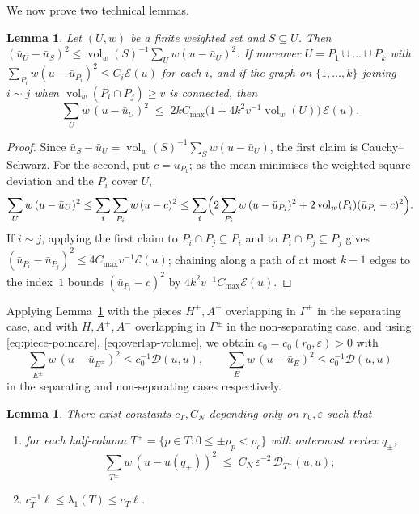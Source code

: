 \documentclass[10pt,reqno]{amsart}
\newtheorem{lemma}[theorem]{Lemma}
\theoremstyle{remark}
\newcommand{\vol}{\operatorname{vol}}
\newcommand{\DD}{\mathcal{D}}
\begin{document}
We now prove two technical lemmas.

\begin{lemma}
\label{lem:glue}
Let $(U,w)$ be a finite weighted set and $S\subseteq U$. Then
$(\bar u_U-\bar u_S)^2\le\vol_w(S)^{-1}\sum_Uw(u-\bar u_U)^2$. If
moreover $U=P_1\cup\dots\cup P_k$ with
$\sum_{P_i}w(u-\bar u_{P_i})^2\le C_i\mathcal E(u)$ for each $i$, and if the
graph on $\{1,\dots,k\}$ joining $i\sim j$ when
$\vol_w(P_i\cap P_j)\ge v$ is connected, then
\[
  \sum_{U}w\,(u-\bar u_U)^2\;\le\;
  2kC_{\max}\bigl(1+4k^2v^{-1}\vol_w(U)\bigr)\,\mathcal E(u).
\]
\end{lemma}

\begin{proof}
Since $\bar u_S-\bar u_U=\vol_w(S)^{-1}\sum_Sw(u-\bar u_U)$, the first
claim is Cauchy--Schwarz. For the second, put $c=\bar u_{P_1}$; as the
mean minimises the weighted square deviation and the $P_i$ cover $U$,
\[
  \sum_{U}w\,(u-\bar u_U)^2\le\sum_i\sum_{P_i}w\,(u-c)^2
  \le\sum_i\Bigl(2\sum_{P_i}w\,(u-\bar u_{P_i})^2
   +2\vol_w(P_i)(\bar u_{P_i}-c)^2\Bigr).
\]
If $i\sim j$, applying the first claim to
$P_i\cap P_j\subseteq P_i$ and to $P_i\cap P_j\subseteq P_j$ gives
$(\bar u_{P_i}-\bar u_{P_j})^2\le4C_{\max}v^{-1}\mathcal E(u)$; chaining along
a path of at most $k-1$ edges to the index~$1$ bounds
$(\bar u_{P_i}-c)^2$ by $4k^2v^{-1}C_{\max}\mathcal E(u)$.
\end{proof}

Applying Lemma~\ref{lem:glue} with the pieces $H^\pm,A^\pm$ overlapping
in $\Gamma^\pm$ in the separating case, and with $H,A^+,A^-$ overlapping
in $\Gamma^\pm$ in the non-separating case, and using \eqref{eq:piece-poincare},
\eqref{eq:overlap-volume}, we obtain $c_0=c_0(r_0,\varepsilon)>0$ with
\begin{equation}
\label{eq:side-gap}
  \sum_{E^\pm}w\,(u-\bar u_{E^\pm})^2\le c_0^{-1}\DD(u,u),
  \qquad
  \sum_{E}w\,(u-\bar u_{E})^2\le c_0^{-1}\DD(u,u)
\end{equation}
in the separating and non-separating cases respectively.

\begin{lemma}
\label{lem:neck}
There exist constants $c_T,C_N$ depending only on $r_0,\varepsilon$ such that
\begin{enumerate}[label=\textup{(\alph*)}]
\item\label{it:neck-pin} for each half-column
$T^\pm=\{p\in T:0\le\pm\rho_p<\rho_c\}$ with outermost vertex $q_\pm$,
\[
  \sum_{T^\pm}w\,(u-u(q_\pm))^2\;\le\;C_N\,\varepsilon^{-2}\,
  \DD_{T^\pm}(u,u);
\]
\item\label{it:neck-two} $c_T^{-1}\ell\le\lambda_1(T)\le c_T\ell$.
\end{enumerate}
\end{lemma}
\end{document}
